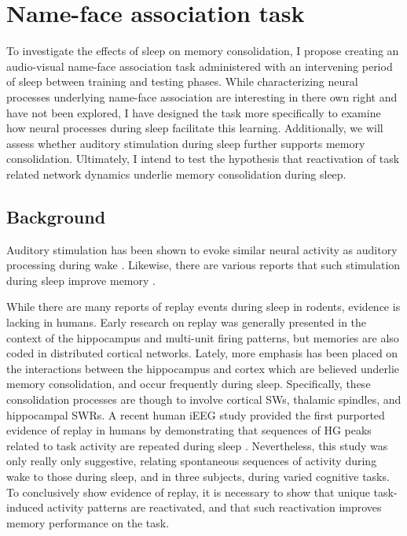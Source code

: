 %
%

\section*{Name-face association task}
To investigate the effects of sleep on memory consolidation, I propose creating an audio-visual name-face association task administered with an intervening period of sleep between training and testing phases. While characterizing neural processes underlying name-face association are interesting in there own right and have not been explored, I have designed the task more specifically to examine how neural processes during sleep facilitate this learning. Additionally, we will assess whether auditory stimulation during sleep further supports memory consolidation. Ultimately, I intend to test the hypothesis that reactivation of task related network dynamics underlie memory consolidation during sleep.

\subsection{Background}
Auditory stimulation has been shown to evoke similar neural activity as auditory processing during wake \citep{Sela2016b, Makov2017e}. Likewise, there are various reports that such stimulation during sleep improve memory \citep{Sela2016b, Makov2017e}.

While there are many reports of replay events during sleep in rodents, evidence is lacking in humans. Early research on replay was generally presented in the context of the hippocampus and multi-unit firing patterns, but memories are also coded in distributed cortical networks. Lately, more emphasis has been placed on the interactions between the hippocampus and cortex which are believed underlie memory consolidation, and occur frequently during sleep. Specifically, these consolidation processes are though to involve cortical SWs, thalamic spindles, and hippocampal SWRs. A recent human iEEG study provided the first purported evidence of replay in humans by demonstrating that sequences of HG peaks related to task activity are repeated during sleep \citep{Jiang2017}. Nevertheless, this study was only really only suggestive, relating spontaneous sequences of activity during wake to those during sleep, and in three subjects, during varied cognitive tasks. To conclusively show evidence of replay, it is necessary to show that unique task-induced activity patterns are reactivated, and that such reactivation improves memory performance on the task.

